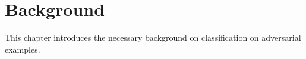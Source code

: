 \chapter{Background}
\label{chap:background}
This chapter introduces the necessary  background on classification on adversarial examples.
\minitoc




